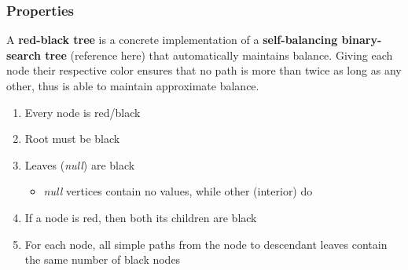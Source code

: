 \documentclass[10pt, 
a4paper, 
oneside, 
headinclude, footinclude, 
BCOR5mm]
{scrartcl}
\begin{document}
\subsubsection{Properties}
A \textbf{red-black tree} is a concrete implementation of a \textbf{self-balancing binary-search tree} (reference here) that automatically maintains balance. 
Giving each node their respective color ensures that no path is more than twice as long as any other, thus is able to maintain approximate balance.\
\begin{enumerate}
    \item Every node is {\color{red}red}/black
    \item Root must be black
    \item Leaves (\textit{null}) are black
    \begin{itemize}
        \item \textit{null} vertices contain no values, while other (interior) do
    \end{itemize}
    \item If a node is {\color{red}red}, then both its children are black
    \item For each node, all simple paths from the node to descendant leaves contain the same number of black nodes 
\end{enumerate}
\end{document}
